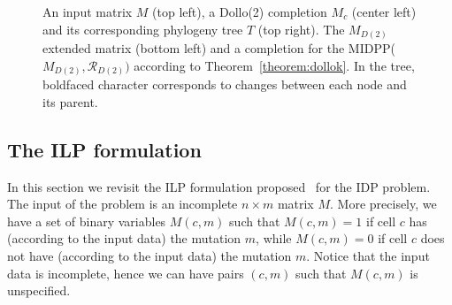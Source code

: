 \documentclass[a4paper,USenglish]{article}
\theoremstyle{definition}
\begin{document}
\begin{figure}[tb!]
  \begin{minipage}{.5\linewidth}
  \end{minipage}
 \begin{minipage}{.5\linewidth}
      \end{minipage}


\caption{An input matrix $M$ (top left), a Dollo(2) completion $M_c$ (center
  left) and its corresponding phylogeny tree $T$ (top right). 
  The $M_{D(2)}$ extended matrix (bottom left) 
  and a completion for the MIDPP($M_{D(2)},\mathcal R_{D(2)})$
  according to Theorem~\ref{theorem:dollok}.
%
In the tree, boldfaced character corresponds to changes between each node and its parent.
}  
    \label{fig:M_e}
  \end{figure}

\subsection{The ILP formulation}
\label{sec:ilp}
In this section we revisit the ILP formulation proposed~\cite{Gusfield2007} for the IDP problem.
%
The input of the problem is an incomplete $n\times m$ matrix $M$.
More precisely, we have a set of binary variables $M(c,m)$ such that $M(c,m)=1$ if cell
$c$ has (according to the input data) the mutation $m$, while $M(c,m)=0$ if cell
$c$ does not have (according to the input data) the mutation $m$.
%
Notice that the input data is incomplete, hence we can have pairs $(c,m)$ such that
$M(c,m)$ is unspecified.
\end{document}
